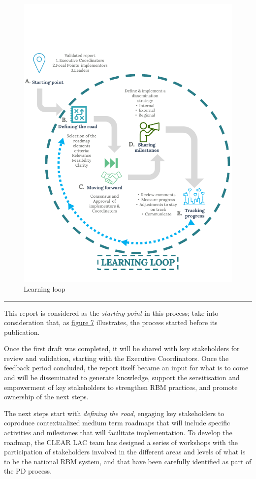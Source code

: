 \documentclass[
  10pt,
]{book}
\begin{document}
\begin{figure}

{\centering \includegraphics[width=0.75\linewidth]{./images/figure_7} 

}

\caption{Learning loop}\label{fig:figure7}
\end{figure}

\begin{center}\rule{0.5\linewidth}{0.5pt}\end{center}

This report is considered as the \emph{starting point} in this process; take into consideration that, as \protect\hyperlink{fig:figure7}{figure 7} illustrates, the process started before its publication.

Once the first draft was completed, it will be shared with key stakeholders for review and validation, starting with the Executive Coordinators. Once the feedback period concluded, the report itself became an input for what is to come and will be disseminated to generate knowledge, support the sensitisation and empowerment of key stakeholders to strengthen RBM practices, and promote ownership of the next steps.

The next steps start with \emph{defining the road}, engaging key stakeholders to coproduce contextualized medium term roadmaps that will include specific activities and milestones that will facilitate implementation. To develop the roadmap, the CLEAR LAC team has designed a series of workshops with the participation of stakeholders involved in the different areas and levels of what is to be the national RBM system, and that have been carefully identified as part of the PD process.
\end{document}
